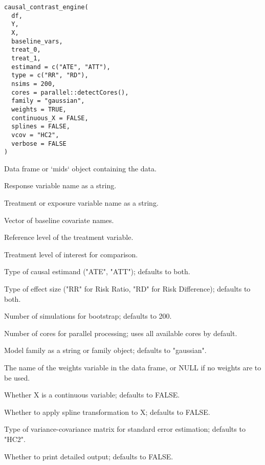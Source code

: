 \documentclass[a4paper]{book}
\begin{document}
%
\begin{Usage}
\begin{verbatim}
causal_contrast_engine(
  df,
  Y,
  X,
  baseline_vars,
  treat_0,
  treat_1,
  estimand = c("ATE", "ATT"),
  type = c("RR", "RD"),
  nsims = 200,
  cores = parallel::detectCores(),
  family = "gaussian",
  weights = TRUE,
  continuous_X = FALSE,
  splines = FALSE,
  vcov = "HC2",
  verbose = FALSE
)
\end{verbatim}
\end{Usage}
%
\begin{Arguments}
\begin{ldescription}
\item[\code{df}] Data frame or `mids` object containing the data.

\item[\code{Y}] Response variable name as a string.

\item[\code{X}] Treatment or exposure variable name as a string.

\item[\code{baseline\_vars}] Vector of baseline covariate names.

\item[\code{treat\_0}] Reference level of the treatment variable.

\item[\code{treat\_1}] Treatment level of interest for comparison.

\item[\code{estimand}] Type of causal estimand ("ATE", "ATT"); defaults to both.

\item[\code{type}] Type of effect size ("RR" for Risk Ratio, "RD" for Risk Difference); defaults to both.

\item[\code{nsims}] Number of simulations for bootstrap; defaults to 200.

\item[\code{cores}] Number of cores for parallel processing; uses all available cores by default.

\item[\code{family}] Model family as a string or family object; defaults to "gaussian".

\item[\code{weights}] The name of the weights variable in the data frame, or NULL if no weights are to be used.

\item[\code{continuous\_X}] Whether X is a continuous variable; defaults to FALSE.

\item[\code{splines}] Whether to apply spline transformation to X; defaults to FALSE.

\item[\code{vcov}] Type of variance-covariance matrix for standard error estimation; defaults to "HC2".

\item[\code{verbose}] Whether to print detailed output; defaults to FALSE.
\end{ldescription}
\end{Arguments}
\end{document}

